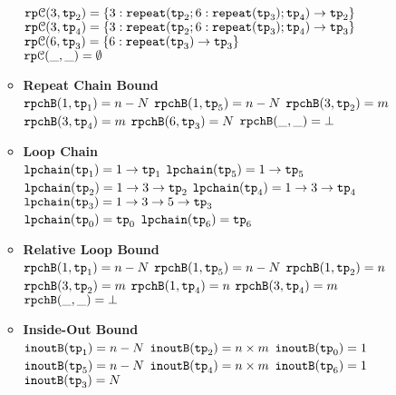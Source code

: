 \begin{enumerate}
\begin{itemize}
  \\
  $\mathtt{rp}\mathcal{C}(3, \mathtt{tp}_2) = \{3: \mathtt{repeat}(\mathtt{tp}_2; 6 : \mathtt{repeat}(\mathtt{tp}_3); \mathtt{tp}_4) \to \mathtt{tp}_2\}$
  \\
  $\mathtt{rp}\mathcal{C}(3, \mathtt{tp}_4) = \{3: \mathtt{repeat}(\mathtt{tp}_2; 6 : \mathtt{repeat}(\mathtt{tp}_3); \mathtt{tp}_4) \to \mathtt{tp}_3\}$
  \\
  $\mathtt{rp}\mathcal{C}(6, \mathtt{tp}_3) = \{6: \mathtt{repeat}(\mathtt{tp}_3) \to \mathtt{tp}_3\}$
  \\
  $\mathtt{rp}\mathcal{C}(\_, \_) = \emptyset$ 
  \item \textbf{Repeat Chain Bound}
  \\
  $\mathtt{rpchB}(1, \mathtt{tp}_1) = n - N$ \quad
  $\mathtt{rpchB}(1, \mathtt{tp}_5) = n - N$ \quad
  $\mathtt{rpchB}(3, \mathtt{tp}_2) = m$ \\
  $\mathtt{rpchB}(3, \mathtt{tp}_4) = m$ \quad
  $\mathtt{rpchB}(6, \mathtt{tp}_3) = N$ \quad \quad 
  $\mathtt{rpchB}(\_, \_) = \bot $ 
  \item \textbf{Loop Chain}
  \\
  $\mathtt{lpchain}(\mathtt{tp}_1) = 1\to \mathtt{tp}_1$ \quad
  $\mathtt{lpchain}(\mathtt{tp}_5) = 1\to \mathtt{tp}_5$ \quad
  $\mathtt{lpchain}(\mathtt{tp}_2) = 1 \to 3 \to \mathtt{tp}_2$ \quad
  $\mathtt{lpchain}(\mathtt{tp}_4) = 1 \to 3 \to \mathtt{tp}_4$ \quad
  \highlight
  {$\mathtt{lpchain}(\mathtt{tp}_3) = 1 \to 3 \to 5 \to \mathtt{tp}_3$ }\\
  $\mathtt{lpchain}(\mathtt{tp}_0) = \mathtt{tp}_0$ \quad
  $\mathtt{lpchain}(\mathtt{tp}_6) = \mathtt{tp}_6$ 
  \item \textbf{{Relative Loop Bound}}
  \\
  $\mathtt{rpchB}(1, \mathtt{tp}_1) = n - N$ \quad
  $\mathtt{rpchB}(1, \mathtt{tp}_5) = n - N$ \quad
  $\mathtt{rpchB}(1, \mathtt{tp}_2) = n$ \quad $\mathtt{rpchB}(3, \mathtt{tp}_2) = m$ \quad
  $\mathtt{rpchB}(1, \mathtt{tp}_4) = n$ \quad $\mathtt{rpchB}(3, \mathtt{tp}_4) = m$ \quad
   \quad
  $\mathtt{rpchB}(\_, \_) = \bot $ 
  \item \textbf{Inside-Out Bound}
  \\
  $\mathtt{inoutB}(\mathtt{tp}_1) = n - N$ \quad
  $\mathtt{inoutB}(\mathtt{tp}_2) = n \times m$ \quad
  $\mathtt{inoutB}(\mathtt{tp}_0) = 1$ 
  \\
  $\mathtt{inoutB}(\mathtt{tp}_5) = n - N$ \quad
  $\mathtt{inoutB}(\mathtt{tp}_4) = n \times m$ \quad
  $\mathtt{inoutB}(\mathtt{tp}_6) = 1$ 
  \\
  $\mathtt{inoutB}(\mathtt{tp}_3) = N$ \quad

\end{itemize}
\end{enumerate}
